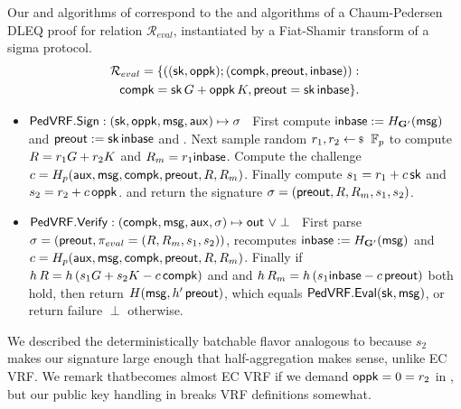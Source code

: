 Our \Sign and \Verify algorithms of \PedVRF correspond to
the \Prove and \Verify algorithms of a Chaum-Pedersen DLEQ proof
 for relation $\mathcal{R}_{eval}$,
instantiated by a Fiat-Shamir transform of a sigma protocol.
\begin{align}
	\mathcal{R}_{eval} = \{((\sk, \openpk); (\compk,\PreOut,\In)): \nonumber\\  %
	\compk = \sk\,\genG + \openpk\,\genB, \PreOut = \sk\,\In \}  \mathperiod \label{rel:commit} 
\end{align}
%
\begin{itemize}
	\item ${\mathsf{PedVRF}}.{\mathsf{Sign}} : (\mathsf{sk},\mathsf{oppk},\mathsf{msg},\mathsf{aux}) \mapsto \sigma$ \,
	First compute ${\mathsf{inbase}} := H_{{\mathbf{G}'}}(\mathsf{msg})$ and ${\mathsf{preout}} := \mathsf{sk} \, {\mathsf{inbase}}$ and \compk.
	Next sample random $r_1,r_2 \leftsample \F_p$
	to compute $R = r_1 G + r_2 K$ and $R_m = r_1 {\mathsf{inbase}}$.
	Compute the challenge $c = H_p(\mathsf{aux},\mathsf{msg},\mathsf{compk},{\mathsf{preout}},R,R_m)$.
	Finally compute $s_1 = r_1 + c \, \mathsf{sk}$ and $s_2 = r_2 + c \, \mathsf{oppk}$.
	and return the signature $\sigma = ({\mathsf{preout}},R,R_m,s_1,s_2)$.

	\item ${\mathsf{PedVRF}}.{\mathsf{Verify}} : (\mathsf{compk},\mathsf{msg},\mathsf{aux},\sigma) \mapsto {\ensuremath{\mathsf{out}}} \,\, \lor \perp$ \,
	First parse $\sigma = ({\mathsf{preout}}, \pi_{eval} = (R,R_m,s_1,s_2))$,
	recomputes ${\mathsf{inbase}} := H_{{\mathbf{G}'}}(\mathsf{msg})$ and 
	$c = H_p(\mathsf{aux},\mathsf{msg},\mathsf{compk},{\mathsf{preout}},R,R_m)$.
    Finally if $h \, R = h \, (s_1 G + s_2 K - c \, \mathsf{compk})$ and
    and $h \, R_m = h \, (s_1 {\mathsf{inbase}} - c \, {\mathsf{preout}})$ both hold,
    then return $H(\mathsf{msg}, {h'}\,{\mathsf{preout}})$, which equals ${\mathsf{PedVRF}}.{\mathsf{Eval}}(\mathsf{sk},\mathsf{msg})$,
    or return failure $\perp$ otherwise.
\end{itemize}
\noindent We described the deterministically batchable flavor analogous
to \cite{HdVBatchEd25519} because $s_2$ makes our signature large enough
that half-aggregation makes sense, unlike EC VRF.
We remark that\PedVRF becomes almost EC VRF if
 we demand $\mathsf{oppk} = 0 = r_2$ in \Sign,
but our public key handling in \PedVRF breaks VRF definitions somewhat.

